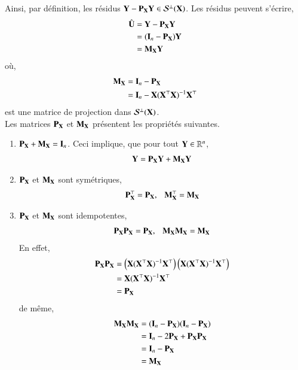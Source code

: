 \documentclass[10pt, reqno]{amsart}
\begin{document}
Ainsi, par définition, les résidus $\mathbf Y - \mathbf P_\mathbf X\mathbf Y\in\mathcal{S}^\perp(\mathbf X)$. Les résidus peuvent s'écrire,
\begin{align*}
\hat{\mathbf U} &= \mathbf Y-\mathbf P_\mathbf X\mathbf Y \\
&= (\mathbf{I}_n - \mathbf P_\mathbf X)\mathbf Y\\
& = \mathbf M_\mathbf X\mathbf Y
\end{align*}
où,
\begin{align*}
\mathbf M_\mathbf X &= \mathbf{I}_n - \mathbf P_\mathbf X\\
& = \mathbf{I}_n - \mathbf X(\mathbf X^\top\mathbf X)^{-1}\mathbf X^\top
\end{align*}
est une matrice de projection dans $\mathcal{S}^\perp(\mathbf X)$.\\
Les matrices $\mathbf P_\mathbf X$ et $\mathbf M_\mathbf X$ présentent les propriétés suivantes.
\begin{enumerate}
\item $\mathbf P_\mathbf X+\mathbf M_\mathbf X = \mathbf{I}_n$. Ceci implique, que pour tout $\mathbf Y\in \mathbb{R}^n$,
\begin{align*}
\mathbf Y = \mathbf P_\mathbf X\mathbf Y+\mathbf M_\mathbf X\mathbf Y
\end{align*}
\item $\mathbf P_\mathbf X$ et $\mathbf M_\mathbf X$ sont symétriques,
\begin{align*}
\mathbf P_\mathbf X^\top = \mathbf P_\mathbf X, \ \ \ \mathbf M_\mathbf X^\top= \mathbf M_\mathbf X
\end{align*}
\item $\mathbf P_\mathbf X$ et $\mathbf M_\mathbf X$ sont idempotentes,
\begin{align*}
\mathbf P_\mathbf X\mathbf P_\mathbf X = \mathbf P_\mathbf X, \ \ \ \mathbf M_\mathbf X \mathbf M_\mathbf X= \mathbf M_\mathbf X
\end{align*}
En effet,
\begin{align*}
\mathbf P_\mathbf X\mathbf P_\mathbf X &= \left(\mathbf X(\mathbf X^\top\mathbf X)^{-1}\mathbf X^\top\right)\left(\mathbf X(\mathbf X^\top\mathbf X)^{-1}\mathbf X^\top\right)\\ 
&= \mathbf X(\mathbf X^\top\mathbf X)^{-1}\mathbf X^\top \\
&= \mathbf P_\mathbf X
\end{align*}
de même,
\begin{align*}
\mathbf M_\mathbf X\mathbf M_\mathbf X &= (\mathbf{I}_n - \mathbf P_\mathbf X)(\mathbf{I}_n - \mathbf P_\mathbf X)\\
& = \mathbf{I}_n - 2\mathbf P_\mathbf X + \mathbf P_\mathbf X\mathbf P_\mathbf X\\
&=\mathbf{I}_n - \mathbf P_\mathbf X\\
&=\mathbf M_\mathbf X
\end{align*}

\end{enumerate}
\end{document}
